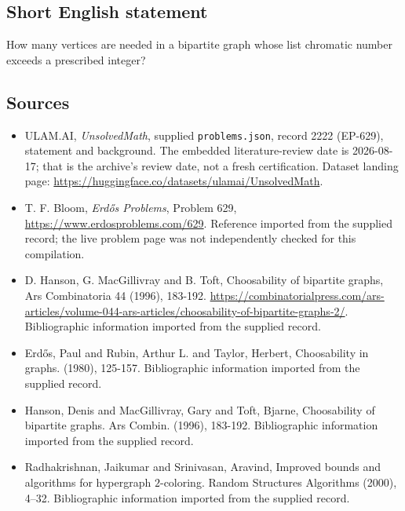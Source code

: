 \documentclass[11pt,a4paper]{article}
\begin{document}
\subsection{Short English statement}

How many vertices are needed in a bipartite graph whose list chromatic number exceeds a prescribed integer?

\subsection{Sources}

{\small

\begin{itemize}

\item[\hypertarget{source:2222:1}{S1}] ULAM.AI, \emph{UnsolvedMath}, supplied \texttt{problems.json}, record 2222 (EP-629), statement and background. The embedded literature-review date is 2026-08-17; that is the archive’s review date, not a fresh certification. Dataset landing page: \url{https://huggingface.co/datasets/ulamai/UnsolvedMath}.

\item[\hypertarget{source:2222:2}{S2}] T. F. Bloom, \emph{Erdős Problems}, Problem 629, \url{https://www.erdosproblems.com/629}. Reference imported from the supplied record; the live problem page was not independently checked for this compilation.

\item[\hypertarget{source:2222:3}{S3}] D. Hanson, G. MacGillivray and B. Toft, Choosability of bipartite graphs, Ars Combinatoria 44 (1996), 183-192. \url{https://combinatorialpress.com/ars-articles/volume-044-ars-articles/choosability-of-bipartite-graphs-2/}. Bibliographic information imported from the supplied record.

\item[\hypertarget{source:2222:4}{S4}] Erd\H{o}s, Paul and Rubin, Arthur L. and Taylor, Herbert, Choosability in graphs. (1980), 125-157. Bibliographic information imported from the supplied record.

\item[\hypertarget{source:2222:5}{S5}] Hanson, Denis and MacGillivray, Gary and Toft, Bjarne, Choosability of bipartite graphs. Ars Combin. (1996), 183-192. Bibliographic information imported from the supplied record.

\item[\hypertarget{source:2222:6}{S6}] Radhakrishnan, Jaikumar and Srinivasan, Aravind, Improved bounds and algorithms for hypergraph {$2$}-coloring. Random Structures Algorithms (2000), 4--32. Bibliographic information imported from the supplied record.

\end{itemize}

}

\label{end:2222}
\end{document}

